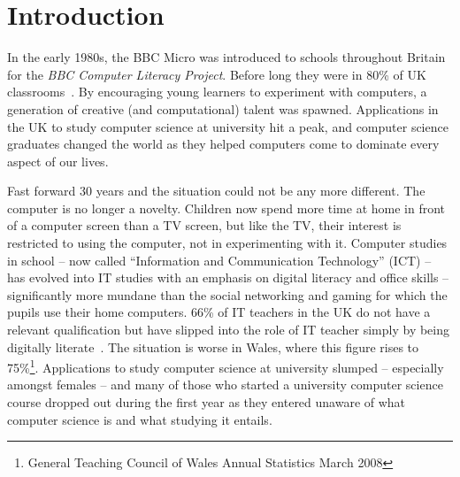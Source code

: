 \documentclass{sig-alternate}
\begin{document}
\section{Introduction}
In the early 1980s, the BBC Micro was introduced to schools throughout
Britain for the \emph{BBC Computer Literacy Project}.
Before long they were in 80\% of UK classrooms~\cite{vasko:1986}.
By encouraging young learners to experiment with computers, a generation
of creative (and computational) talent was spawned. Applications in
the UK to study computer science at university hit a peak, and
computer science graduates changed the world as they helped computers
come to dominate every aspect of our lives.

Fast forward 30 years and the situation could not be any more
different. The computer is no longer a novelty. Children now spend
more time at home in front of a computer screen than a TV screen, but
like the TV, their interest is restricted to using the computer, not
in experimenting with it. Computer studies in school -- now called
``Information and Communication Technology'' (ICT) -- has evolved into IT
studies with an emphasis on digital literacy and office skills --
significantly more mundane than the social networking and gaming for
which the pupils use their home computers. 66\% of IT teachers in the
UK do not have a relevant qualification but have slipped into the role
of IT teacher simply by being digitally literate~\cite{RoyalSoc:2012}.
The situation is worse in Wales, where this figure rises to
75\%\footnote{General Teaching Council of Wales Annual Statistics March 2008}.
Applications to
study computer science at university slumped -- especially amongst
females -- and many of those who started a university computer science
course dropped out during the first year as they entered unaware of what
computer science is and what studying it entails.
\end{document}
